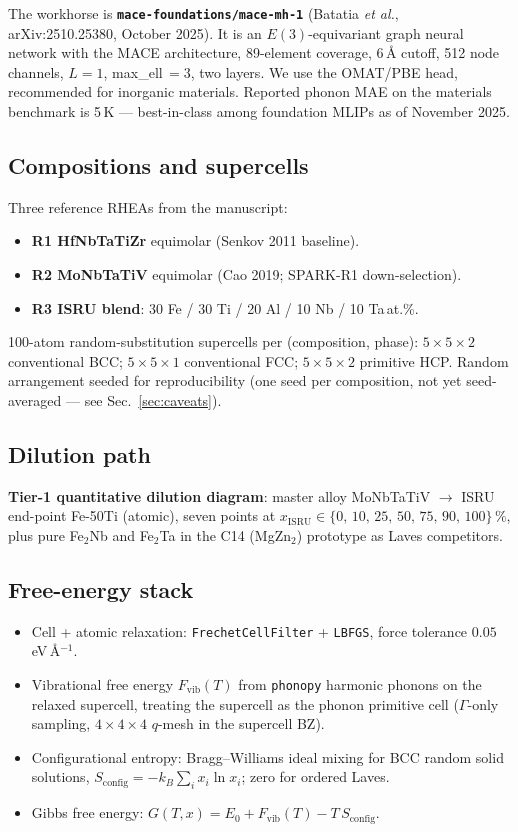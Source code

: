 \documentclass[11pt,a4paper]{article}
\begin{document}
The workhorse is \textbf{\texttt{mace-foundations/mace-mh-1}} (Batatia
\emph{et al.}, arXiv:2510.25380, October 2025). It is an
$E(3)$-equivariant graph neural network with the MACE architecture, 89-element
coverage, 6\,\AA{} cutoff, 512 node channels, $L=1$, max\_ell\,$=3$,
two layers. We use the OMAT/PBE head, recommended for inorganic materials.
Reported phonon MAE on the materials benchmark is 5\,K --- best-in-class among
foundation MLIPs as of November 2025.

\subsection{Compositions and supercells}

Three reference RHEAs from the manuscript:
\begin{itemize}
  \item \textbf{R1 HfNbTaTiZr} equimolar (Senkov 2011 baseline).
  \item \textbf{R2 MoNbTaTiV} equimolar (Cao 2019; SPARK-R1 down-selection).
  \item \textbf{R3 ISRU blend}: 30 Fe / 30 Ti / 20 Al / 10 Nb / 10 Ta\,at.\%.
\end{itemize}

100-atom random-substitution supercells per (composition, phase): $5\times5\times2$
conventional BCC; $5\times5\times1$ conventional FCC; $5\times5\times2$ primitive
HCP. Random arrangement seeded for reproducibility (one seed per composition,
not yet seed-averaged --- see Sec.~\ref{sec:caveats}).

\subsection{Dilution path}

\textbf{Tier-1 quantitative dilution diagram}: master alloy MoNbTaTiV
$\rightarrow$ ISRU end-point Fe-50Ti (atomic), seven points at
$x_{\text{ISRU}} \in \{0,\,10,\,25,\,50,\,75,\,90,\,100\}\,\%$, plus pure
Fe$_2$Nb and Fe$_2$Ta in the C14 (MgZn$_2$) prototype as Laves competitors.

\subsection{Free-energy stack}

\begin{itemize}
  \item Cell + atomic relaxation: \texttt{FrechetCellFilter} + \texttt{LBFGS},
        force tolerance $0.05$\,eV\,\AA$^{-1}$.
  \item Vibrational free energy $F_{\text{vib}}(T)$ from \texttt{phonopy}
        harmonic phonons on the relaxed supercell, treating the supercell as
        the phonon primitive cell ($\Gamma$-only sampling, $4\times4\times4$
        $q$-mesh in the supercell BZ).
  \item Configurational entropy: Bragg--Williams ideal mixing for BCC random
        solid solutions, $S_{\text{config}} = -k_B \sum_i x_i \ln x_i$; zero
        for ordered Laves.
  \item Gibbs free energy: $G(T,x) = E_0 + F_{\text{vib}}(T) - T\,S_{\text{config}}$.
\end{itemize}
\end{document}
